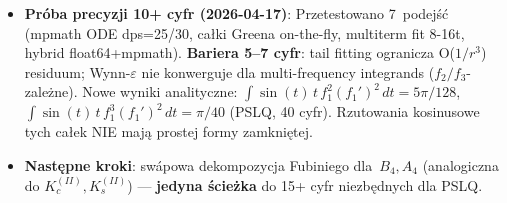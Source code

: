 \begin{itemize}
        15+ cyfr, co wymaga sw\'apowej dekompozycji ca\l{}ek \'zr\'od\l{}owych.
  \item \textbf{Pr\'oba precyzji 10+ cyfr (2026-04-17)}: Przetestowano 7~podej\'s\'c
        (mpmath ODE dps=25/30, ca\l{}ki Greena on-the-fly, multiterm fit 8-16t,
        hybrid float64+mpmath). \textbf{Bariera 5--7 cyfr}: tail fitting ogranicza
        O($1/r^3$) residuum; Wynn-$\varepsilon$ nie konwerguje dla multi-frequency
        integrands ($f_2/f_3$-zale\.zne). Nowe wyniki analityczne:
        $\int \sin(t)\,t\,f_1^2(f_1')^2\,dt = 5\pi/128$,
        $\int \sin(t)\,t\,f_1^3(f_1')^2\,dt = \pi/40$ (PSLQ, 40 cyfr).
        Rzutowania kosinusowe tych ca\l{}ek NIE maj\k{a} prostej formy zamkni\k{e}tej.
  \item \textbf{Nast\k{e}pne kroki}: sw\'apowa dekompozycja Fubiniego dla~$B_4, A_4$
        (analogiczna do $K_c^{(II)}, K_s^{(II)}$) --- \textbf{jedyna \'scie\.zka}
        do 15+ cyfr niezb\k{e}dnych dla PSLQ.
\end{itemize}

